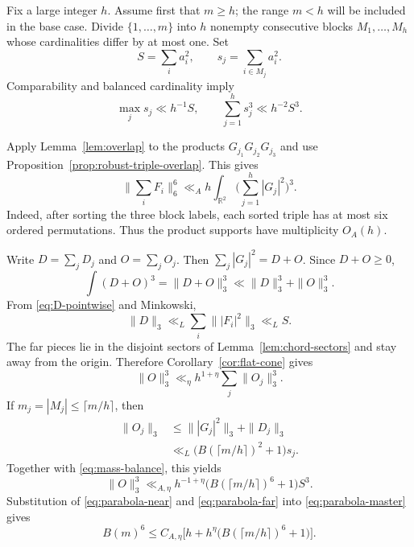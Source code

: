\documentclass{amsart}
\numberwithin{equation}{section}
\newcommand{\R}{\mathbb{R}}
\begin{document}
Fix a large integer $h$.  Assume first that $m\ge h$; the range $m<h$ will be
included in the base case.  Divide $\{1,\ldots,m\}$ into $h$ nonempty
consecutive blocks $M_1,\ldots,M_h$ whose cardinalities differ by at most one.
Set
\[
 S=\sum_i a_i^2,
 \qquad s_j=\sum_{i\in M_j}a_i^2.
\]
Comparability and balanced cardinality imply
\begin{equation}\label{eq:mass-balance}
 \max_js_j\ll h^{-1}S,
 \qquad
 \sum_{j=1}^h s_j^3\ll h^{-2}S^3.
\end{equation}

Apply Lemma~\ref{lem:overlap} to the products
$G_{j_1}G_{j_2}G_{j_3}$ and use
Proposition~\ref{prop:robust-triple-overlap}.  This gives
\begin{equation}\label{eq:parabola-master}
 \Big\|\sum_iF_i\Big\|_6^6
 \ll_A h\int_{\R^2}\Big(\sum_{j=1}^h|G_j|^2\Big)^3.
\end{equation}
Indeed, after sorting the three block labels, each sorted triple has at most
six ordered permutations.  Thus the product supports have multiplicity
$O_A(h)$.

Write $D=\sum_jD_j$ and $O=\sum_jO_j$.  Then
$\sum_j|G_j|^2=D+O$.  Since $D+O\ge0$,
\[
 \int(D+O)^3=\|D+O\|_3^3
 \ll \|D\|_3^3+\|O\|_3^3.
\]
From \eqref{eq:D-pointwise} and Minkowski,
\begin{equation}\label{eq:parabola-near}
 \|D\|_3\ll_L\sum_i\||F_i|^2\|_3
 \ll_L S.
\end{equation}
The far pieces lie in the disjoint sectors of
Lemma~\ref{lem:chord-sectors} and stay away from the origin.  Therefore
Corollary~\ref{cor:flat-cone} gives
\[
 \|O\|_3^3\ll_\eta h^{1+\eta}\sum_j\|O_j\|_3^3.
\]
If $m_j=|M_j|\le\lceil m/h\rceil$, then
\begin{align*}
 \|O_j\|_3
 &\le \||G_j|^2\|_3+\|D_j\|_3\\
 &\ll_L\big(B(\lceil m/h\rceil)^2+1\big)s_j.
\end{align*}
Together with \eqref{eq:mass-balance}, this yields
\begin{equation}\label{eq:parabola-far}
 \|O\|_3^3
 \ll_{A,\eta}h^{-1+\eta}
 \big(B(\lceil m/h\rceil)^6+1\big)S^3.
\end{equation}
Substitution of \eqref{eq:parabola-near} and
\eqref{eq:parabola-far} into \eqref{eq:parabola-master} gives
\begin{equation}\label{eq:parabola-recurrence}
 B(m)^6\le C_{A,\eta}
 \Big[h+h^\eta\big(B(\lceil m/h\rceil)^6+1\big)\Big].
\end{equation}
\end{document}
